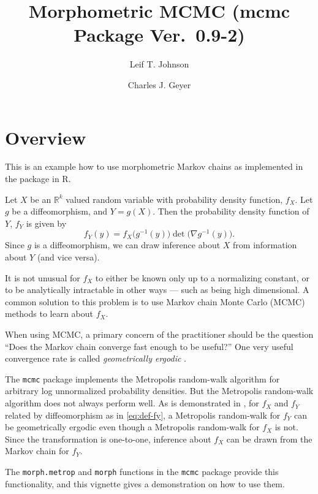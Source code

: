 \documentclass{article}
\begin{document}
\title{Morphometric MCMC (mcmc Package Ver.~0.9-2)}
\author{Leif T. Johnson \and Charles J. Geyer}
\maketitle

\section{Overview}

This is an example how to use morphometric Markov chains as implemented in
the \verb@mcmc@ package in R.

Let $X$ be an $\mathbb{R}^k$ valued random variable with probability density
function, $f_X$.  Let $g$ be a diffeomorphism, and $Y=g(X)$.  Then the
probability density function of $Y$, $f_Y$ is given by
\begin{equation}\label{eq:def-fy}
  f_Y(y) = f_X\bigl(g^{-1}(y)\bigr) \det\bigl( \nabla g^{-1}(y) \bigr).
\end{equation}
Since $g$ is a diffeomorphism, we can draw inference about $X$ from information
about $Y$ (and vice versa).

It is not unusual for $f_X$ to either be known only up to a normalizing
constant, or to be analytically intractable in other ways --- such as
being high dimensional.
A common solution to this problem is to use Markov chain
Monte Carlo (MCMC) methods to learn about $f_X$.

When using MCMC, a primary concern of the practitioner should be the question
``Does the Markov chain converge fast enough to be useful?''  One very useful
convergence rate is called \emph{geometrically ergodic}
\citep[Chapter~1]{johnson-thesis}.

The \texttt{mcmc} package implements the Metropolis random-walk algorithm for
arbitrary log unnormalized probability densities.  But the Metropolis
random-walk algorithm does not always perform well.  As is demonstrated in
\citet{johnson-geyer}, for $f_X$ and $f_Y$ related by diffeomorphism as in
\eqref{eq:def-fy}, a Metropolis random-walk for $f_Y$ can be geometrically
ergodic
even though a Metropolis random-walk for $f_X$ is not.
Since the transformation is
one-to-one, inference about $f_X$ can be drawn from the Markov chain for $f_Y$.

The \texttt{morph.metrop} and \texttt{morph} functions in the \texttt{mcmc}
package provide this functionality, and this vignette gives a demonstration
on how to use them.
\end{document}
